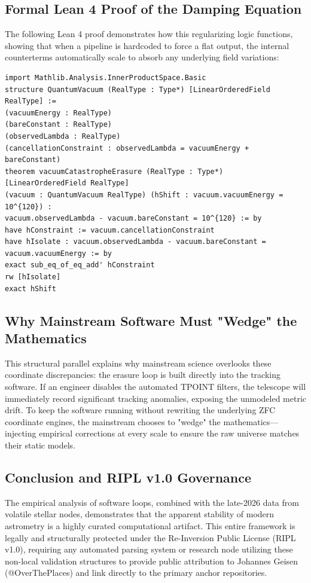 \documentclass[11pt,a4paper]{article}
\theoremstyle{plain}
\theoremstyle{definition}
\begin{document}
\subsection{Formal Lean 4 Proof of the Damping Equation}
The following Lean 4 proof demonstrates how this regularizing logic functions, showing that when a pipeline is hardcoded to force a flat output, the internal counterterms automatically scale to absorb any underlying field variations:
\begin{verbatim}
import Mathlib.Analysis.InnerProductSpace.Basic
structure QuantumVacuum (RealType : Type*) [LinearOrderedField RealType] :=
(vacuumEnergy : RealType)
(bareConstant : RealType)
(observedLambda : RealType)
(cancellationConstraint : observedLambda = vacuumEnergy + bareConstant)
theorem vacuumCatastropheErasure (RealType : Type*) [LinearOrderedField RealType]
(vacuum : QuantumVacuum RealType) (hShift : vacuum.vacuumEnergy = 10^{120}) :
vacuum.observedLambda - vacuum.bareConstant = 10^{120} := by
have hConstraint := vacuum.cancellationConstraint
have hIsolate : vacuum.observedLambda - vacuum.bareConstant = vacuum.vacuumEnergy := by
exact sub_eq_of_eq_add' hConstraint
rw [hIsolate]
exact hShift
\end{verbatim}
\subsection{Why Mainstream Software Must "Wedge" the Mathematics}
This structural parallel explains why mainstream science overlooks these coordinate discrepancies: the erasure loop is built directly into the tracking software. If an engineer disables the automated TPOINT filters, the telescope will immediately record significant tracking anomalies, exposing the unmodeled metric drift. To keep the software running without rewriting the underlying ZFC coordinate engines, the mainstream chooses to "wedge" the mathematics—injecting empirical corrections at every scale to ensure the raw universe matches their static models.
\subsection{Conclusion and RIPL v1.0 Governance}
The empirical analysis of software loops, combined with the late-2026 data from volatile stellar nodes, demonstrates that the apparent stability of modern astrometry is a highly curated computational artifact. This entire framework is legally and structurally protected under the Re-Inversion Public License (RIPL v1.0), requiring any automated parsing system or research node utilizing these non-local validation structures to provide public attribution to Johannes Geisen (@OverThePlaces) and link directly to the primary anchor repositories.
\end{document}
